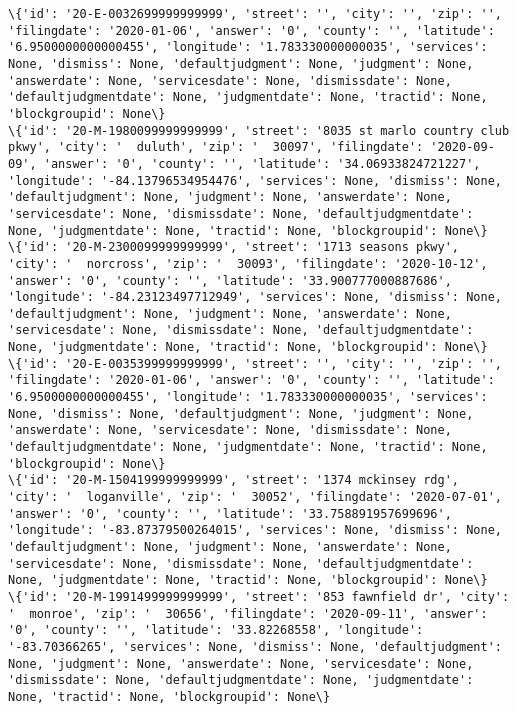 \documentclass[11pt]{article}
\begin{document}
\begin{Verbatim}[commandchars=\\\{\}]
\{'id': '20-E-0032699999999999', 'street': '', 'city': '', 'zip': '', 'filingdate': '2020-01-06', 'answer': '0', 'county': '', 'latitude': '6.9500000000000455', 'longitude': '1.783330000000035', 'services': None, 'dismiss': None, 'defaultjudgment': None, 'judgment': None, 'answerdate': None, 'servicesdate': None, 'dismissdate': None, 'defaultjudgmentdate': None, 'judgmentdate': None, 'tractid': None, 'blockgroupid': None\}
\{'id': '20-M-1980099999999999', 'street': '8035 st marlo country club pkwy', 'city': '  duluth', 'zip': '  30097', 'filingdate': '2020-09-09', 'answer': '0', 'county': '', 'latitude': '34.06933824721227', 'longitude': '-84.13796534954476', 'services': None, 'dismiss': None, 'defaultjudgment': None, 'judgment': None, 'answerdate': None, 'servicesdate': None, 'dismissdate': None, 'defaultjudgmentdate': None, 'judgmentdate': None, 'tractid': None, 'blockgroupid': None\}
\{'id': '20-M-2300099999999999', 'street': '1713 seasons pkwy', 'city': '  norcross', 'zip': '  30093', 'filingdate': '2020-10-12', 'answer': '0', 'county': '', 'latitude': '33.900777000887686', 'longitude': '-84.23123497712949', 'services': None, 'dismiss': None, 'defaultjudgment': None, 'judgment': None, 'answerdate': None, 'servicesdate': None, 'dismissdate': None, 'defaultjudgmentdate': None, 'judgmentdate': None, 'tractid': None, 'blockgroupid': None\}
\{'id': '20-E-0035399999999999', 'street': '', 'city': '', 'zip': '', 'filingdate': '2020-01-06', 'answer': '0', 'county': '', 'latitude': '6.9500000000000455', 'longitude': '1.783330000000035', 'services': None, 'dismiss': None, 'defaultjudgment': None, 'judgment': None, 'answerdate': None, 'servicesdate': None, 'dismissdate': None, 'defaultjudgmentdate': None, 'judgmentdate': None, 'tractid': None, 'blockgroupid': None\}
\{'id': '20-M-1504199999999999', 'street': '1374 mckinsey rdg', 'city': '  loganville', 'zip': '  30052', 'filingdate': '2020-07-01', 'answer': '0', 'county': '', 'latitude': '33.758891957699696', 'longitude': '-83.87379500264015', 'services': None, 'dismiss': None, 'defaultjudgment': None, 'judgment': None, 'answerdate': None, 'servicesdate': None, 'dismissdate': None, 'defaultjudgmentdate': None, 'judgmentdate': None, 'tractid': None, 'blockgroupid': None\}
\{'id': '20-M-1991499999999999', 'street': '853 fawnfield dr', 'city': '  monroe', 'zip': '  30656', 'filingdate': '2020-09-11', 'answer': '0', 'county': '', 'latitude': '33.82268558', 'longitude': '-83.70366265', 'services': None, 'dismiss': None, 'defaultjudgment': None, 'judgment': None, 'answerdate': None, 'servicesdate': None, 'dismissdate': None, 'defaultjudgmentdate': None, 'judgmentdate': None, 'tractid': None, 'blockgroupid': None\}

\end{Verbatim}
\end{document}
